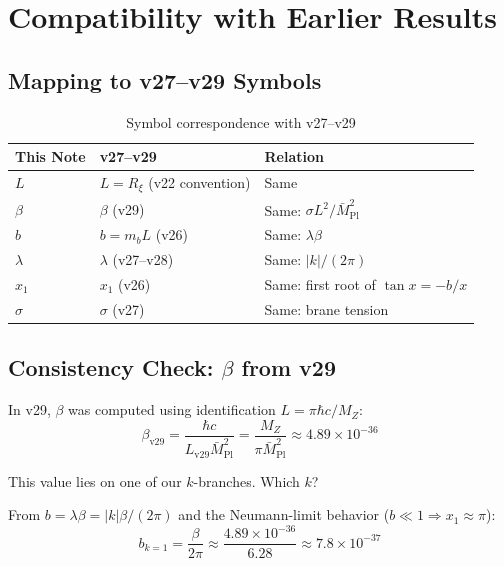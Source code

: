 \documentclass[11pt,a4paper]{article}
\begin{document}
\section{Compatibility with Earlier Results}
\label{sec:compatibility}

\subsection{Mapping to v27--v29 Symbols}

\begin{table}[h]
\centering
\caption{Symbol correspondence with v27--v29}
\label{tab:symbol-map}
\begin{tabular}{lll}
\toprule
This Note & v27--v29 & Relation \\
\midrule
$L$ & $L = R_\xi$ (v22 convention) & Same \\
$\beta$ & $\beta$ (v29) & Same: $\sigma L^2 / \bar{M}_{\text{Pl}}^2$ \\
$b$ & $b = m_b L$ (v26) & Same: $\lambda \beta$ \\
$\lambda$ & $\lambda$ (v27--v28) & Same: $|k|/(2\pi)$ \\
$x_1$ & $x_1$ (v26) & Same: first root of $\tan x = -b/x$ \\
$\sigma$ & $\sigma$ (v27) & Same: brane tension \\
\bottomrule
\end{tabular}
\end{table}

\subsection{Consistency Check: $\beta$ from v29}

In v29, $\beta$ was computed using identification $L = \pi\hbar c/M_Z$:
\begin{equation}
  \beta_{\text{v29}} = \frac{\hbar c}{L_{\text{v29}} \bar{M}_{\text{Pl}}^2}
                     = \frac{M_Z}{\pi \bar{M}_{\text{Pl}}^2}
                     \approx 4.89 \times 10^{-36}
  \label{eq:beta-v29}
\end{equation}

This value lies on one of our $k$-branches. Which $k$?

From $b = \lambda \beta = |k|\beta/(2\pi)$ and the Neumann-limit behavior
($b \ll 1 \Rightarrow x_1 \approx \pi$):
\begin{equation}
  b_{k=1} = \frac{\beta}{2\pi} \approx \frac{4.89 \times 10^{-36}}{6.28}
          \approx 7.8 \times 10^{-37}
  \label{eq:b-k1}
\end{equation}
\end{document}
